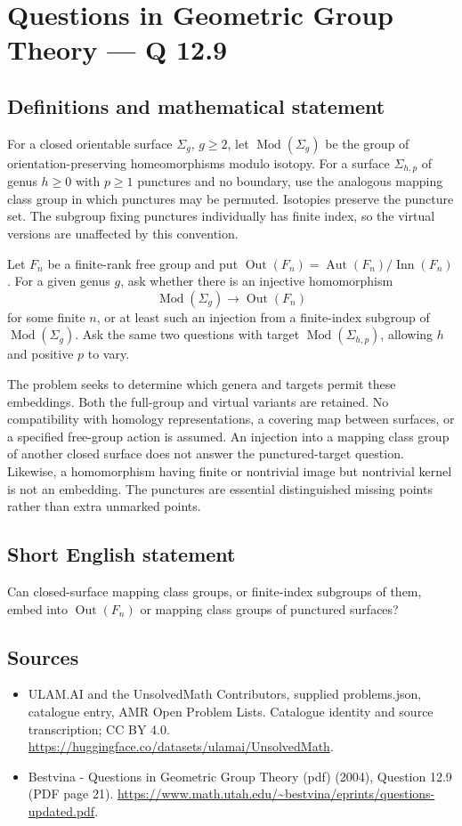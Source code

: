 \documentclass[11pt,a4paper]{article}
\begin{document}
\section*{Questions in Geometric Group Theory — Q 12.9}\label{statement}

\subsection{Definitions and mathematical statement}
For a closed orientable surface $\Sigma_g$, $g\geq2$, let $\operatorname{Mod}(\Sigma_g)$ be the group of orientation-preserving homeomorphisms modulo isotopy. For a surface $\Sigma_{h,p}$ of genus $h\geq0$ with $p\geq1$ punctures and no boundary, use the analogous mapping class group in which punctures may be permuted. Isotopies preserve the puncture set. The subgroup fixing punctures individually has finite index, so the virtual versions are unaffected by this convention.

Let $F_n$ be a finite-rank free group and put $\operatorname{Out}(F_n)=\operatorname{Aut}(F_n)/\operatorname{Inn}(F_n)$. For a given genus $g$, ask whether there is an injective homomorphism
\[
 \operatorname{Mod}(\Sigma_g)\longrightarrow\operatorname{Out}(F_n)
\]
for some finite $n$, or at least such an injection from a finite-index subgroup of $\operatorname{Mod}(\Sigma_g)$. Ask the same two questions with target $\operatorname{Mod}(\Sigma_{h,p})$, allowing $h$ and positive $p$ to vary.

The problem seeks to determine which genera and targets permit these embeddings. Both the full-group and virtual variants are retained. No compatibility with homology representations, a covering map between surfaces, or a specified free-group action is assumed. An injection into a mapping class group of another closed surface does not answer the punctured-target question. Likewise, a homomorphism having finite or nontrivial image but nontrivial kernel is not an embedding. The punctures are essential distinguished missing points rather than extra unmarked points.
\subsection{Short English statement}
Can closed-surface mapping class groups, or finite-index subgroups of them, embed into $\operatorname{Out}(F_n)$ or mapping class groups of punctured surfaces?
\subsection{Sources}
\begin{itemize}
\item[S1] ULAM.AI and the UnsolvedMath Contributors, supplied problems.json, catalogue entry, AMR Open Problem Lists. Catalogue identity and source transcription; CC BY 4.0.
\url{https://huggingface.co/datasets/ulamai/UnsolvedMath}.
\item[S2] Bestvina - Questions in Geometric Group Theory (pdf) (2004), Question 12.9 (PDF page 21). 
\url{https://www.math.utah.edu/~bestvina/eprints/questions-updated.pdf}.
\end{itemize}
\end{document}
